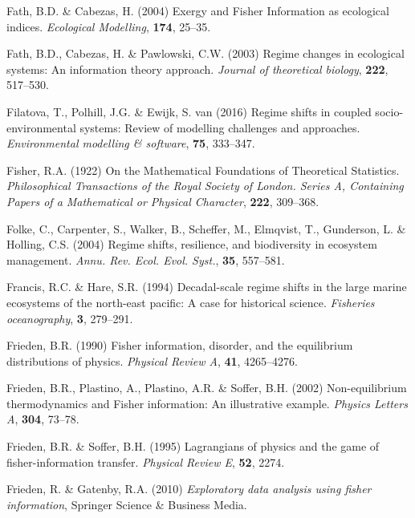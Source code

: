 \documentclass[print]{nuthesis}
\begin{document}
\leavevmode\hypertarget{ref-fath_exergy_2004}{}%
Fath, B.D. \& Cabezas, H. (2004) Exergy and Fisher Information as ecological indices. \emph{Ecological Modelling}, \textbf{174}, 25--35.

\leavevmode\hypertarget{ref-fath_regime_2003}{}%
Fath, B.D., Cabezas, H. \& Pawlowski, C.W. (2003) Regime changes in ecological systems: An information theory approach. \emph{Journal of theoretical biology}, \textbf{222}, 517--530.

\leavevmode\hypertarget{ref-filatova2016regime}{}%
Filatova, T., Polhill, J.G. \& Ewijk, S. van (2016) Regime shifts in coupled socio-environmental systems: Review of modelling challenges and approaches. \emph{Environmental modelling \& software}, \textbf{75}, 333--347.

\leavevmode\hypertarget{ref-fisher_mathematical_1922}{}%
Fisher, R.A. (1922) On the Mathematical Foundations of Theoretical Statistics. \emph{Philosophical Transactions of the Royal Society of London. Series A, Containing Papers of a Mathematical or Physical Character}, \textbf{222}, 309--368.

\leavevmode\hypertarget{ref-folke2004regime}{}%
Folke, C., Carpenter, S., Walker, B., Scheffer, M., Elmqvist, T., Gunderson, L. \& Holling, C.S. (2004) Regime shifts, resilience, and biodiversity in ecosystem management. \emph{Annu. Rev. Ecol. Evol. Syst.}, \textbf{35}, 557--581.

\leavevmode\hypertarget{ref-francis1994decadal}{}%
Francis, R.C. \& Hare, S.R. (1994) Decadal-scale regime shifts in the large marine ecosystems of the north-east pacific: A case for historical science. \emph{Fisheries oceanography}, \textbf{3}, 279--291.

\leavevmode\hypertarget{ref-frieden_fisher_1990}{}%
Frieden, B.R. (1990) Fisher information, disorder, and the equilibrium distributions of physics. \emph{Physical Review A}, \textbf{41}, 4265--4276.

\leavevmode\hypertarget{ref-frieden_non-equilibrium_2002}{}%
Frieden, B.R., Plastino, A., Plastino, A.R. \& Soffer, B.H. (2002) Non-equilibrium thermodynamics and Fisher information: An illustrative example. \emph{Physics Letters A}, \textbf{304}, 73--78.

\leavevmode\hypertarget{ref-frieden1995lagrangians}{}%
Frieden, B.R. \& Soffer, B.H. (1995) Lagrangians of physics and the game of fisher-information transfer. \emph{Physical Review E}, \textbf{52}, 2274.

\leavevmode\hypertarget{ref-frieden_exploratory_2010}{}%
Frieden, R. \& Gatenby, R.A. (2010) \emph{Exploratory data analysis using fisher information}, Springer Science \& Business Media.
\end{document}
